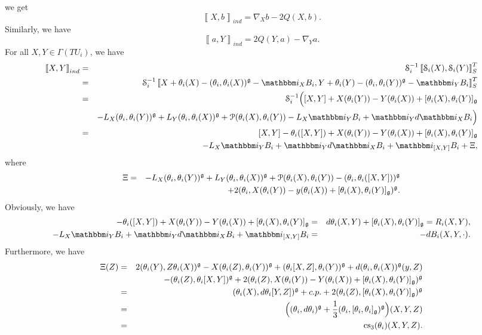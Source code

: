 \documentclass[letterpaper,10pt, oneside]{article} %
\newcommand{\ii}{\mathbbm i}
\newcommand{\cs}{\mathrm{cs}}
\newcommand{\huaS}{\mathcal{S}}
\newcommand{\huaP}{\mathcal{P}}
\newcommand{\Courant}[1]{\left\llbracket  #1\right\rrbracket }
\begin{document}
we get
\begin{equation} \label{eq:gbr2}
\Courant{X,b}_{ind}=\nabla_Xb-2Q(X,b).
  \end{equation}
Similarly, we have
\begin{equation}\label{eq:gbr3}
\Courant{a,Y}_{ind}=2Q(Y,a)-\nabla_Ya.
  \end{equation}
 For all $X,Y\in\Gamma(TU_i)$, we have
  \begin{eqnarray*}
  \Courant{X,Y}_{ind}&=&\huaS_i^{-1}\Courant{\huaS_i(X),\huaS_i(Y)}^T_S\\
  &=&\huaS_i^{-1}\Courant{X+\theta_i(X)-(\theta_i,\theta_i(X))^\g-\ii_XB_i,Y+\theta_i(Y)-(\theta_i,\theta_i(Y))^\g-\ii_YB_i}^T_S\\
  &=&\huaS_i^{-1}\Big([X,Y]+X(\theta_i(Y))-Y(\theta_i(X))+[\theta_i(X),\theta_i(Y)]_\g\\
  &&-L_X(\theta_i,\theta_i(Y))^\g+L_Y(\theta_i,\theta_i(X))^\g+\huaP(\theta_i(X),\theta_i(Y))-L_X\ii_YB_i+\ii_Yd\ii_XB_i\Big)\\
  &=&[X,Y]-\theta_i([X,Y])+X(\theta_i(Y))-Y(\theta_i(X))+[\theta_i(X),\theta_i(Y)]_\g\\
  &&-L_X\ii_YB_i+\ii_Yd\ii_XB_i+\ii_{[X,Y]}B_i+\Xi,
  \end{eqnarray*}
  where
  \begin{eqnarray*}
\Xi&=&  -L_X(\theta_i,\theta_i(Y))^\g+L_Y(\theta_i,\theta_i(X))^\g+\huaP(\theta_i(X),\theta_i(Y))-(\theta_i,\theta_i([X,Y]))^\g\\
&&+2(\theta_i,X(\theta_i(Y))-y(\theta_i(X))+[\theta_i(X),\theta_i(Y)]_\g)^\g.
\end{eqnarray*}
 Obviously, we have
\begin{eqnarray*}
  -\theta_i([X,Y])+X(\theta_i(Y))-Y(\theta_i(X))+[\theta_i(X),\theta_i(Y)]_\g&=&d\theta_i(X,Y)+[\theta_i(X),\theta_i(Y)]_\g=R_i(X,Y),\\
  -L_X\ii_YB_i+\ii_Yd\ii_XB_i+\ii_{[X,Y]}B_i&=&-dB_i(X,Y,\cdot).
\end{eqnarray*}
Furthermore, we have
  \begin{eqnarray*}
    \Xi(Z)&=&2(\theta_i(Y),Z\theta_i(X))^\g-X(\theta_i(Z),\theta_i(Y))^\g+(\theta_i[X,Z],\theta_i(Y))^\g+d(\theta_i,\theta_i(X))^\g(y,Z)\\
    &&-(\theta_i(Z),\theta_i[X,Y])^\g+2(\theta_i(Z),X(\theta_i(Y))-Y(\theta_i(X))+[\theta_i(X),\theta_i(Y)]_\g)^\g\\
    &=&(\theta_i(X),d\theta_i[Y,Z])^\g+c.p.+2(\theta_i(Z),[\theta_i(X),\theta_i(Y)]_\g)^\g\\
    &=&\Big((\theta_i,d\theta_i)^\g+\frac{1}{3}(\theta_i,[\theta_i,\theta_i]_\g)^\g\Big)(X,Y,Z)\\
    &=&\cs_3(\theta_i)(X,Y,Z).
  \end{eqnarray*}
\end{document}
